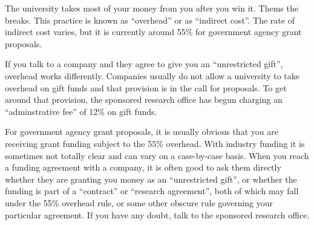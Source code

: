 The university takes most of your money from you after you win it.  Thems the
breaks.  This practice is known as ``overhead'' or as ``indirect cost''. The
rate of indirect cost varies, but it is currently around 55\% for government
agency grant proposals.   

If you talk to a company and they agree to give you an ``unrestricted gift'',
overhead works differently.  Companies usually do not allow a university to
take overhead on gift funds and that provision is in the call for proposals.
To get around that provision, the sponsored research office has begun charging
an ``adminstrative fee'' of 12\% on gift funds.

For government agency grant proposals, it is usually obvious that you are
receiving grant funding subject to the 55\% overhead.  With industry funding it
is sometimes not totally clear and can vary on a case-by-case basis.  When you
reach a funding agreement with a company, it is often good to ask them directly
whether they are granting you money as an ``unrestricted gift'', or whether the
funding is part of a ``contract'' or ``research agreement'', both of which may
fall under the 55\% overhead rule, or some other obscure rule governing your
particular agreement.  If you have any doubt, talk to the sponsored research
office.
